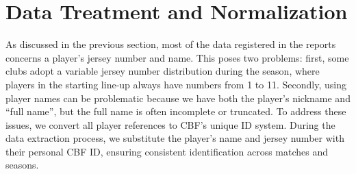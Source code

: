 \section{Data Treatment and Normalization}
\label{sec:data_treatment}

As discussed in the previous section, most of the data registered in the reports concerns a player's jersey number and name.
This poses two problems: first, some clubs adopt a variable jersey number distribution during the season, where players in the starting line-up always have numbers from 1 to 11.
Secondly, using player names can be problematic because we have both the player's nickname and ``full name'', but the full name is often incomplete or truncated.
To address these issues, we convert all player references to CBF's unique ID system.
During the data extraction process, we substitute the player's name and jersey number with their personal CBF ID, ensuring consistent identification across matches and seasons.

